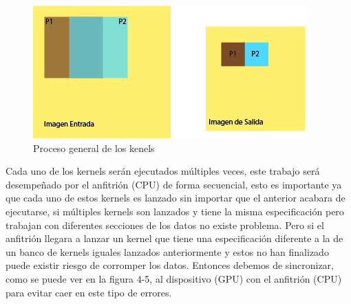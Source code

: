 \begin{figure}[ph]
			\centering
				\includegraphics[scale=1]{img/prosImg.jpg}
			\caption{Proceso general de los kenels}
\end{figure}




Cada uno de los kernels serán ejecutados múltiples veces, este trabajo será desempeñado por el anfitrión (CPU) de forma secuencial, esto es importante ya que cada uno de estos kernels es lanzado sin importar que el anterior acabara de ejecutarse, si múltiples kernels son lanzados y tiene la misma especificación pero trabajan con diferentes secciones de los datos no existe problema. Pero si el anfitrión llegara a lanzar un kernel que tiene una especificación diferente a la de un banco de kernels iguales lanzados anteriormente y estos no han finalizado puede existir riesgo de corromper los datos. Entonces debemos de sincronizar, como se puede ver en la figura 4-5, al  dispositivo (GPU) con el anfitrión (CPU) para evitar caer en este tipo de errores.

